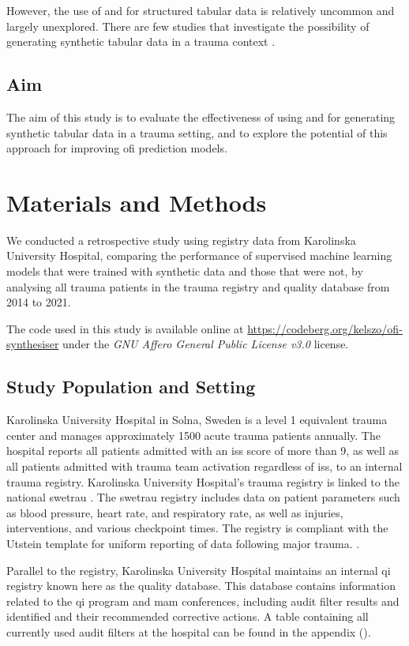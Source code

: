 \documentclass[12pt, a4paper]{article}
\begin{document}
However, the use of  and  for structured tabular data is relatively uncommon and largely unexplored. There are few studies that investigate the possibility of generating synthetic tabular data in a trauma context \cite{}.

\subsection{Aim}
The aim of this study is to evaluate the effectiveness of using  and  for generating synthetic tabular data in a trauma setting, and to explore the potential of this approach for improving \acrshort{ofi} prediction models.

\section{Materials and Methods}
We conducted a retrospective study using registry data from Karolinska University Hospital, comparing the performance of supervised machine learning models that were trained with synthetic data and those that were not, by analysing all trauma patients in the trauma registry and quality database from 2014 to 2021.

The code used in this study is available online at \url{https://codeberg.org/kelszo/ofi-synthesiser} under the \textit{GNU Affero General Public License v3.0} license.

\subsection{Study Population and Setting}
Karolinska University Hospital in Solna, Sweden is a level 1 equivalent trauma center and manages approximately 1500 acute trauma patients annually. The hospital reports all patients admitted with an \acrfull{iss} score of more than 9, as well as all patients admitted with trauma team activation regardless of \acrshort{iss}, to an internal trauma registry. Karolinska University Hospital's trauma registry is linked to the national \acrfull{swetrau} \cite{swetrau}. The \acrshort{swetrau} registry includes data on patient parameters such as blood pressure, heart rate, and respiratory rate, as well as injuries, interventions, and various checkpoint times. The registry is compliant with the Utstein template for uniform reporting of data following major trauma. \cite{ringdal_utstein_2008}.

Parallel to the registry, Karolinska University Hospital maintains an internal \acrshort{qi} registry known here as the quality database.  This database contains information related to the \acrshort{qi} program and \acrshort{mam} conferences, including audit filter results and identified  and their recommended corrective actions. A table containing all currently used audit filters at the hospital can be found in the appendix ().
\end{document}
